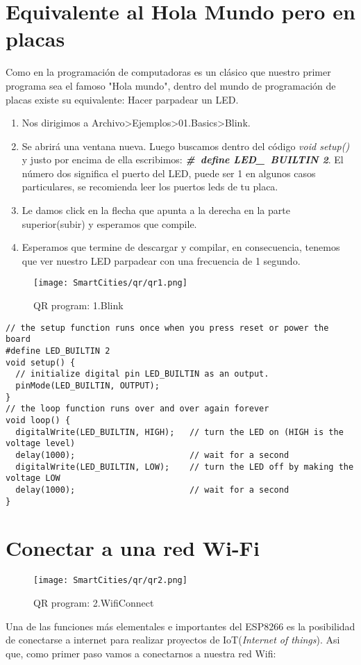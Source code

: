 \documentclass[11pt,fleqn]{book} %
\begin{document}
\section{Equivalente al Hola Mundo pero en placas}
Como en la programación de computadoras es un clásico que nuestro primer programa sea el famoso "Hola mundo", dentro del mundo de programación de placas existe su equivalente: Hacer parpadear un LED.
\begin{enumerate}
\item Nos dirigimos a Archivo>Ejemplos>01.Basics>Blink.
\item Se abrirá una ventana nueva. Luego buscamos dentro del código \textit{void setup()} y justo por encima de ella escribimos: \textit{\textbf{\#\ define LED\_\ BUILTIN 2}}. El número dos significa el puerto del LED, puede ser 1 en algunos casos particulares, se recomienda leer los puertos leds de tu placa.
\item Le damos click en la flecha que apunta a la derecha en la parte superior(subir) y esperamos que compile.
\item Esperamos que termine de descargar y compilar, en consecuencia, tenemos que ver nuestro LED parpadear con una frecuencia de 1 segundo.
\end{enumerate}
\begin{wrapfigure}{r}{0.1\linewidth}
\centering\texttt{[image: SmartCities/qr/qr1.png]}
\caption{QR program: 1.Blink}
\label{fig:qr1}
\end{wrapfigure}
\begin{lstlisting}[caption={Blink Program},captionpos=b]
// the setup function runs once when you press reset or power the board
#define LED_BUILTIN 2
void setup() {
  // initialize digital pin LED_BUILTIN as an output.
  pinMode(LED_BUILTIN, OUTPUT);
}
// the loop function runs over and over again forever
void loop() {
  digitalWrite(LED_BUILTIN, HIGH);   // turn the LED on (HIGH is the voltage level)
  delay(1000);                       // wait for a second
  digitalWrite(LED_BUILTIN, LOW);    // turn the LED off by making the voltage LOW
  delay(1000);                       // wait for a second
}
\end{lstlisting}
\section{Conectar a una red Wi-Fi}
\begin{wrapfigure}{r}{0.1\linewidth}
\centering\texttt{[image: SmartCities/qr/qr2.png]}
\caption{QR program: 2.WifiConnect}
\label{fig:qr2}
\end{wrapfigure}
Una de las funciones más elementales e importantes del ESP8266 es la posibilidad de conectarse a internet para realizar proyectos de IoT(\textit{Internet of things}). Asi que, como primer paso vamos a conectarnos a nuestra red Wifi:
\end{document}
